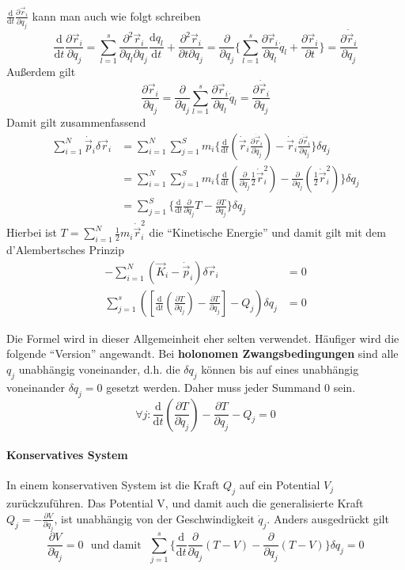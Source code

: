 \documentclass[oneside]{book}
\theoremstyle{definition}
\renewcommand{\d}{\mathrm d}
\newcommand{\dd}[1]{\frac{\d}{\d #1}}
\newcommand{\fpartial}[1]{\frac{\partial}{\partial #1}}
\newcommand{\ffpartial}[2]{\frac{\partial #1}{\partial #2}}
\newcommand{\dotvec}[1]{\dot{\vec{#1}}}
\begin{document}
$\dd t \ffpartial{\vec{r}_i}{q_j}$ kann man auch wie folgt schreiben 
$$\dd{t} \ffpartial{\vec{r}_i}{q_j} = \sum_{l=1}^s \frac{\partial^2 \vec{r}_i}{\partial q_l \partial q_j} \frac{\d q_l}{\d t} + \frac{\partial^2 \vec{r}_i}{\partial t \partial q_j} = \fpartial{q_j} \{ \sum_{l=1}^s \ffpartial{\vec{r}_i}{q_l} \dot{q}_l + \ffpartial{\vec{r}_i}{t}\} = \ffpartial{\dot{\vec{r}}_i}{q_j}$$
Außerdem gilt
$$\ffpartial{\vec{r}_i}{q_j} = \fpartial{\dot q_j} \sum_{l = 1}^s \ffpartial{\vec{r}_i}{q_l} \dot{q}_l = \ffpartial{\dot{\vec{r}}_i}{\dot{q}_j}$$
Damit gilt zusammenfassend
\begin{align*}
\sum_{i = 1}^N \dot{\vec{p}}_i \delta \vec{r}_i &= \sum_{i=1}^N \sum_{j = 1}^S m_i \{ \dd{t} (\dotvec{r}_i  \ffpartial{\dot{\vec{r}}_i}{\dot{q}_j})  -\dot{\vec{r}}_i \ffpartial{\dotvec r_i}{q_j} \} \delta q_j\\ 
&= \sum_{i=1}^N\sum_{j=1}^S m_i \{  \dd{t} (\fpartial{\dot q_j} \frac12 \dotvec{r}_i^2) -\fpartial{q_j} (\frac12 \dot{\vec{r}}_i^2) \} \delta q_j \\
&= \sum_{j = 1}^S \{ \dd{t} \fpartial{\dot{q}_j} T - \ffpartial{T}{q_j} \} \delta q_j
\end{align*}
Hierbei ist $T = \sum_{i = 1}^{N} \frac12 m_i \dot{\vec{r}}_i^2$ die "`Kinetische Energie"'
und damit gilt mit dem d'Alembertsches Prinzip
\begin{align*}
- \sum_{i = 1}^{N} (\vec{K}_i - \dot{\vec{p}}_i) \delta \vec{r}_i &= 0\\
\sum_{j = 1}^s( [\dd{t} ( \ffpartial{T}{\dot{q}_j}) - \ffpartial{T}{q_j}] - Q_j ) \delta q_j &= 0
\end{align*}

Die Formel wird in dieser Allgemeinheit eher selten verwendet. Häufiger wird die folgende "`Version"' angewandt. Bei \textbf{holonomen Zwangsbedingungen} sind alle $q_j$ unabhängig voneinander, d.h. die $\delta q_j$  können bis auf eines unabhängig voneinander $\delta q_j = 0$ gesetzt werden. Daher muss jeder Summand 0 sein.
$$\forall j:  \dd t ( \ffpartial{T}{\dot{q}_j}) - \ffpartial{T}{q_j} - Q_j = 0$$

\paragraph{Konservatives System}
In einem konservativen System ist die Kraft $Q_j$ auf ein Potential $V_j$ zurückzuführen. Das Potential V, und damit auch die generalisierte Kraft $Q_j = - \ffpartial{V}{q_j}$, ist unabhängig von der Geschwindigkeit $\dot{q}_j$. Anders ausgedrückt gilt
$$\ffpartial{V}{\dot q_j} = 0 \text{~ und damit ~} \sum_{j=1}^s \{  \dd{t} \fpartial{\dot{q}_j} (T-V) - \fpartial{q_j} (T -V) \} \delta q_j = 0$$
\end{document}
